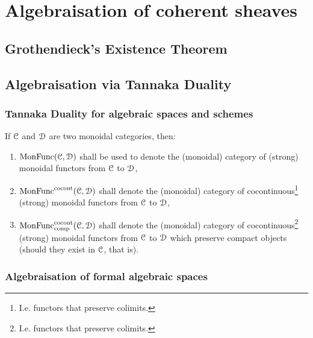 \section{Algebraisation of coherent sheaves}
    \subsection{Grothendieck's Existence Theorem}

    \subsection{Algebraisation via Tannaka Duality}
        \subsubsection{Tannaka Duality for algebraic spaces and schemes}
            \begin{convention}
                If $\mathcal{C}$ and $\mathcal{D}$ are two monoidal categories, then:
                    \begin{enumerate}
                        \item $\mathrm{Mon}\mathrm{Func}(\mathcal{C}, \mathcal{D})$ shall be used to denote the (monoidal) category of (strong) monoidal functors from $\mathcal{C}$ to $\mathcal{D}$,
                        \item $\mathrm{Mon}\mathrm{Func}^{\mathrm{co}\mathrm{cont}}(\mathcal{C}, \mathcal{D})$ shall denote the (monoidal) category of cocontinuous\footnote{I.e. functors that preserve colimits.} (strong) monoidal functors from $\mathcal{C}$ to $\mathcal{D}$,
                        \item $\mathrm{Mon}\mathrm{Func}^{\mathrm{co}\mathrm{cont}}_{\mathrm{comp}}(\mathcal{C}, \mathcal{D})$ shall denote the (monoidal) category of cocontinuous\footnote{I.e. functors that preserve colimits.} (strong) monoidal functors from $\mathcal{C}$ to $\mathcal{D}$ which preserve compact objects (should they exist in $\mathcal{C}$, that is).
                    \end{enumerate}
            \end{convention}
        
        \subsubsection{Algebraisation of formal algebraic spaces}